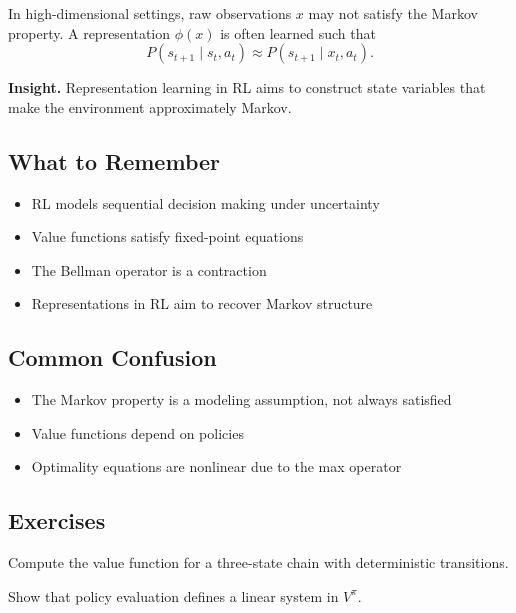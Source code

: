 In high-dimensional settings, raw observations $x$ may not satisfy the Markov property.  
A representation $\phi(x)$ is often learned such that
\[
P(s_{t+1} \mid s_t, a_t)
\approx
P(s_{t+1} \mid x_t, a_t).
\]

\medskip

\noindent
\textbf{Insight.}  
Representation learning in RL aims to construct state variables that make the environment approximately Markov.

\subsection{What to Remember}

\begin{itemize}
\item RL models sequential decision making under uncertainty
\item Value functions satisfy fixed-point equations
\item The Bellman operator is a contraction
\item Representations in RL aim to recover Markov structure
\end{itemize}

\subsection{Common Confusion}

\begin{itemize}
\item The Markov property is a modeling assumption, not always satisfied
\item Value functions depend on policies
\item Optimality equations are nonlinear due to the max operator
\end{itemize}

\subsection{Exercises}

\begin{exercise}
Compute the value function for a three-state chain with deterministic transitions.
\end{exercise}

\begin{exercise}
Show that policy evaluation defines a linear system in $V^\pi$.
\end{exercise}

